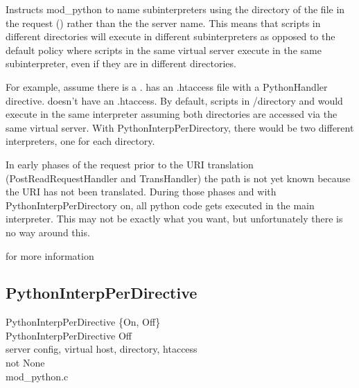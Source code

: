 Instructs mod_python to name subinterpreters using the directory of
the file in the request () rather than the the
server name. This means that scripts in different directories will
execute in different subinterpreters as opposed to the default policy
where scripts in the same virtual server execute in the same
subinterpreter, even if they are in different directories.

For example, assume there is a
.  has an .htaccess
file with a PythonHandler directive.  
doesn't have an .htaccess. By default, scripts in /directory and
 would execute in the same interpreter assuming
both directories are accessed via the same virtual server. With
PythonInterpPerDirectory, there would be two different interpreters,
one for each directory.

\begin{notice}
  In early phases of the request prior to the URI translation
  (PostReadRequestHandler and TransHandler) the path is not yet known
  because the URI has not been translated. During those phases and
  with PythonInterpPerDirectory on, all python code gets executed in
  the main interpreter. This may not be exactly what you want, but
  unfortunately there is no way around this.
\end{notice}

\begin{seealso}
           {for more information}
\end{seealso}

\subsection{PythonInterpPerDirective\label{dir-other-ipdv}}

PythonInterpPerDirective \{On, Off\} \\
PythonInterpPerDirective Off\\
server config, virtual host, directory, htaccess\\
not None\\
mod_python.c

